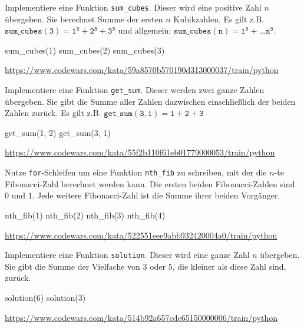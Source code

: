 \documentclass[class=scrartcl, crop=false]{standalone}
\begin{document}
\begin{aufgabe} \noindent
Implementiere eine Funktion \texttt{sum_cubes}. Dieser wird eine positive Zahl $n$ übergeben. Sie berechnet Summe der ersten $n$ Kubikzahlen. Es gilt z.B. $ \mathtt{sum\_cubes} (\mathtt{3}) = \mathtt{1^{3} + 2 ^{3} + 3^{3}}$ und allgemein: $ \mathtt{sum\_cubes} (\mathtt{n}) =  \mathtt{1^{3}} + \dots \mathtt{n^{3}}$.


\begin{pyconsole}
sum_cubes(1)
sum_cubes(2)
sum_cubes(3)
\end{pyconsole}

\noindent\url{https://www.codewars.com/kata/59a8570b570190d313000037/train/python}

\end{aufgabe}


\begin{aufgabe} \noindent
Implementiere eine Funktion \texttt{get_sum}. Dieser werden zwei ganze Zahlen übergeben. Sie gibt die Summe aller Zahlen dazwischen einschließlich der beiden Zahlen zurück. Es gilt z.B. $ \mathtt{get\_sum} (\mathtt{3, 1}) = \mathtt{1 + 2 + 3}$


\begin{pyconsole}
get_sum(1, 2)
get_sum(3, 1)
\end{pyconsole}

\noindent\url{https://www.codewars.com/kata/55f2b110f61eb01779000053/train/python}

\end{aufgabe}

\begin{aufgabe} \noindent
Nutze  \texttt{for}-Schleifen um eine Funktion \texttt{nth_fib} zu schreiben, mit der die $n$-te Fibonacci-Zahl berechnet werden kann. Die ersten beiden Fibonacci-Zahlen sind $0$ und $1$. Jede weitere Fibonacci-Zahl ist die Summe ihrer beiden Vorgänger.

\begin{pyconsole}
nth_fib(1)
nth_fib(2)
nth_fib(3)
nth_fib(4)
\end{pyconsole}

\noindent\url{https://www.codewars.com/kata/522551eee9abb932420004a0/train/python}

\end{aufgabe}


\Huge{}

\normalsize
\begin{aufgabe} \noindent
Implementiere eine Funktion \texttt{solution}. Dieser wird eine ganze Zahl $n$ übergeben. 
Sie gibt die Summe der Vielfache von $3$ oder $5$, die kleiner als diese Zahl sind, zurück.

\begin{pyconsole}
solution(6)
solution(3)
\end{pyconsole}

\noindent\url{https://www.codewars.com/kata/514b92a657cdc65150000006/train/python}

\end{aufgabe}
\end{document}
